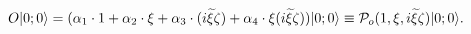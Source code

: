 \begin{equation}
\label{twins}
O|0;0 \rangle = (\alpha_1 \cdot 1 + \alpha_2 \cdot \xi + \alpha_3 \cdot 
(i{\widetilde \xi} \zeta) + \alpha_4 \cdot \xi(i{\widetilde 
\xi}\zeta))|0;0 \rangle \equiv {\cal P}_o(1,\xi,i{\widetilde 
\xi}\zeta)|0;0 \rangle.
\end{equation}

